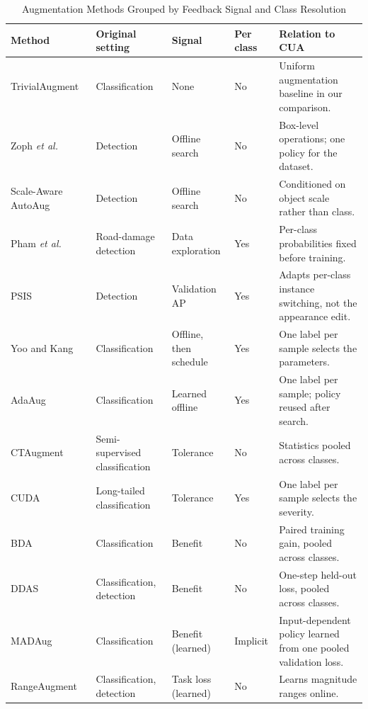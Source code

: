 \begin{table}[t]
\caption{Augmentation Methods Grouped by Feedback Signal and Class Resolution}
\label{tab:policies}
\centering
\small
\setlength{\tabcolsep}{3.5pt}
\renewcommand{\arraystretch}{1.12}
\begin{tabularx}{\textwidth}{@{}p{}p{}p{}p{}Y@{}}
\toprule
\textbf{Method} & \textbf{Original setting} & \textbf{Signal} & \textbf{Per class} & \textbf{Relation to CUA} \\
\midrule
TrivialAugment~\cite{muller2021trivial} & Classification & None & No & Uniform augmentation baseline in our comparison. \\
Zoph \emph{et al.}~\cite{zoph2020det} & Detection & Offline search & No & Box-level operations; one policy for the dataset. \\
Scale-Aware AutoAug~\cite{chen2021scale} & Detection & Offline search & No & Conditioned on object scale rather than class. \\
Pham \emph{et al.}~\cite{rdd_detectron2} & Road-damage detection & Data exploration & Yes & Per-class probabilities fixed before training. \\
PSIS~\cite{wang2019psis} & Detection & Validation AP & Yes & Adapts per-class instance switching, not the appearance edit. \\
Yoo and Kang~\cite{yoo2023} & Classification & Offline, then schedule & Yes & One label per sample selects the parameters. \\
AdaAug~\cite{cheung2022adaaug} & Classification & Learned offline & Yes & One label per sample; policy reused after search. \\
CTAugment~\cite{berthelot2020} & Semi-supervised classification & Tolerance & No & Statistics pooled across classes. \\
CUDA~\cite{ahn2023cuda} & Long-tailed classification & Tolerance & Yes & One label per sample selects the severity. \\
BDA~\cite{lu2023bda} & Classification & Benefit & No & Paired training gain, pooled across classes. \\
DDAS~\cite{liu2021ddas} & Classification, detection & Benefit & No & One-step held-out loss, pooled across classes. \\
MADAug~\cite{hou2023madaug} & Classification & Benefit (learned) & Implicit & Input-dependent policy learned from one pooled validation loss. \\
RangeAugment~\cite{mehta2022rangeaugment} & Classification, detection & Task loss (learned) & No & Learns magnitude ranges online. \\

\end{tabularx}
\end{table}
